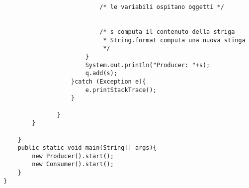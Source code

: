 \begin{lstlisting}
                           /* le variabili ospitano oggetti */
                           

                           /* s computa il contenuto della striga
                            * String.format computa una nuova stinga
                            */
                       }
                       System.out.println("Producer: "+s);
                       q.add(s);
                   }catch (Exception e){
                       e.printStackTrace();
                   }

               }
        }

    }
    public static void main(String[] args){
        new Producer().start();
        new Consumer().start();
    }
}
\end{lstlisting}